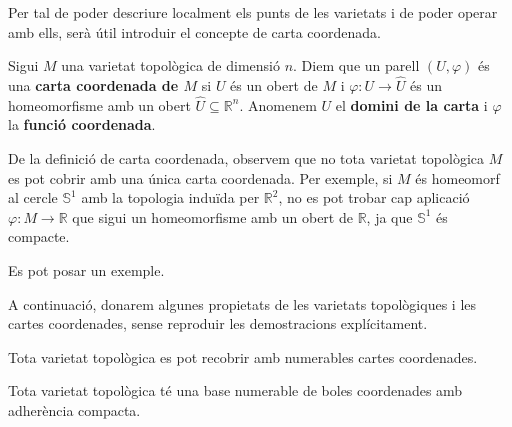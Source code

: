 Per tal de poder descriure localment els punts de les varietats i de poder operar amb ells, serà útil introduir el concepte de carta coordenada.

\begin{defi}
    Sigui $M$ una varietat topològica de dimensió $n$. Diem que un parell $(U,\varphi)$ és una \textbf{carta coordenada de $M$} si $U$ és un obert de $M$ i $\varphi:U\to\hat U$ és un homeomorfisme amb un obert $\hat U\subseteq\mathbb R^n$. Anomenem $U$ el \textbf{domini de la carta} i $\varphi$ la \textbf{funció coordenada}.
\end{defi}
\begin{obs}
    De la definició de carta coordenada, observem que no tota varietat topològica $M$ es pot cobrir amb una única carta coordenada. Per exemple, si $M$ és homeomorf al cercle $\mathbb S^1$ amb la topologia induïda per $\mathbb R^2$, no es pot trobar cap aplicació $\varphi:M\to\mathbb R$ que sigui un homeomorfisme amb un obert de $\mathbb R$, ja que $\mathbb S^1$ és compacte.
\end{obs}

{\color{blue} Es pot posar un exemple.}

A continuació, donarem algunes propietats de les varietats topològiques i les cartes coordenades, sense reproduir les demostracions explícitament.

\begin{lema}
    Tota varietat topològica es pot recobrir amb numerables cartes coordenades.
\end{lema}


\begin{lema}
    Tota varietat topològica té una base numerable de boles coordenades amb adherència compacta.
\end{lema}


